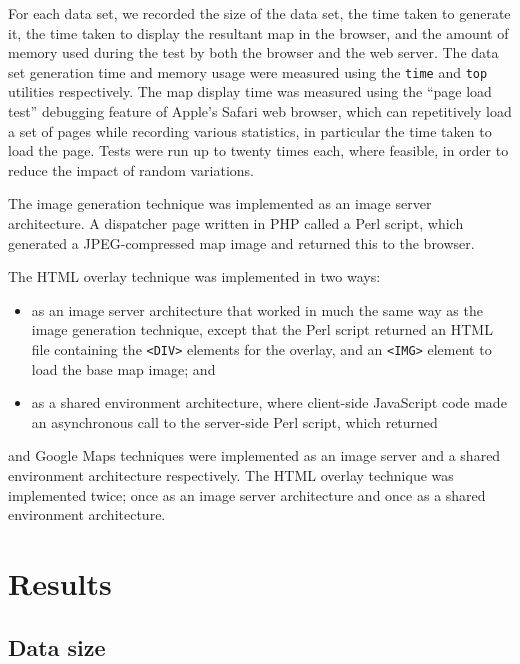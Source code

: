 \documentclass[acmtocl,acmnow]{acmtrans2m}
\begin{document}
For each data set, we recorded the size of the data set, the time taken
to generate it, the time taken to display the resultant map in the
browser, and the amount of memory used during the test by both the
browser and the web server. The data set generation time and memory
usage were measured using the \texttt{time} and \texttt{top} utilities
respectively. The map display time was measured using the ``page load
test'' debugging feature of Apple's Safari web browser, which can
repetitively load a set of pages while recording various statistics, in
particular the time taken to load the page. Tests were run up to twenty
times each, where feasible, in order to reduce the impact of random
variations.


The image generation technique was implemented as an image server
architecture. A dispatcher page written in PHP called a Perl script,
which generated a JPEG-compressed map image and returned this to the
browser.

The HTML overlay technique was implemented in two ways:
\begin{itemize}

	\item as an image server architecture that worked in much the same way
	as the image generation technique, except that the Perl script
	returned an HTML file containing the \verb|<DIV>| elements for the
	overlay, and an \verb|<IMG>| element to load the base map image; and
	
	\item as a shared environment architecture, where client-side
	JavaScript code made an asynchronous call to the server-side Perl
	script, which returned

\end{itemize}

and Google Maps techniques were implemented as an image server and a
shared environment architecture respectively. The HTML overlay technique
was implemented twice; once as an image server architecture and once as
a shared environment architecture.


\section{Results}
\label{sec-results}


\subsection{Data size}
\end{document}
